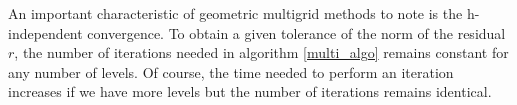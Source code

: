 An important characteristic of geometric multigrid methods to note is the h-independent convergence. To obtain a given tolerance of the norm of the residual $r$, the number of iterations needed in algorithm \ref{multi_algo} remains constant for any number of levels. Of course, the time needed to perform an iteration increases if we have more levels but the number of iterations remains identical. 














